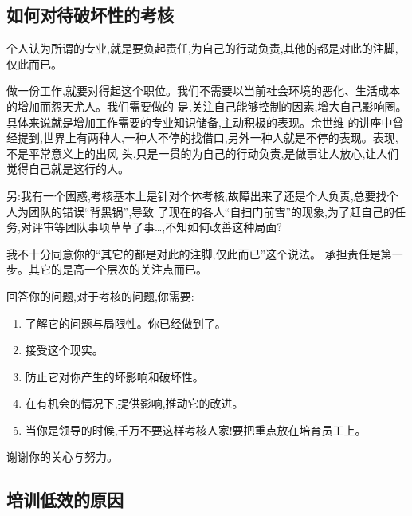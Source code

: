 \documentclass[11pt]{article}
\begin{document}
\subsection{如何对待破坏性的考核}
\begin{staff}

\slogo 个人认为所谓的专业,就是要负起责任,为自己的行动负责,其他的都是对此的注脚,仅此而已。

做一份工作,就要对得起这个职位。我们不需要以当前社会环境的恶化、生活成本的增加而怨天尤人。我们需要做的
是,关注自己能够控制的因素,增大自己影响圈。具体来说就是增加工作需要的专业知识储备,主动积极的表现。余世维
的讲座中曾经提到,世界上有两种人,一种人不停的找借口,另外一种人就是不停的表现。表现,不是平常意义上的出风
头,只是一贯的为自己的行动负责,是做事让人放心,让人们觉得自己就是这行的人。
	
另:我有一个困惑,考核基本上是针对个体考核,故障出来了还是个人负责,总要找个人为团队的错误``背黑锅'',导致
了现在的各人``自扫门前雪''的现象,为了赶自己的任务,对评审等团队事项草草了事\ldots ,不知如何改善这种局面?
\end{staff}

\begin{yang}

\ylogo 我不十分同意你的``其它的都是对此的注脚,仅此而已''这个说法。
承担责任是第一步。其它的是高一个层次的关注点而已。

回答你的问题,对于考核的问题,你需要:
\begin{enumerate}
  \item 了解它的问题与局限性。你已经做到了。
  \item 接受这个现实。
  \item 防止它对你产生的坏影响和破坏性。
  \item 在有机会的情况下,提供影响,推动它的改进。
  \item 当你是领导的时候,千万不要这样考核人家!要把重点放在培育员工上。
\end{enumerate}

谢谢你的关心与努力。
\end{yang}

\subsection{培训低效的原因}
\end{document}
